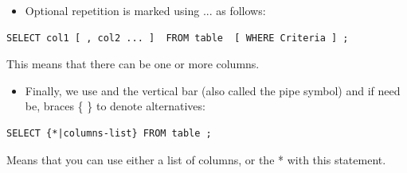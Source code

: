 \begin{itemize}
\item Optional repetition is marked using ... as follows:
\end{itemize}

\begin{lstlisting}
SELECT col1 [ , col2 ... ]  FROM table  [ WHERE Criteria ] ;
\end{lstlisting}

This means that there can be one or more columns.

\begin{itemize}
\item Finally, we use and the vertical bar {\textbar} (also called the pipe symbol) and if need be, braces \{ \} to denote alternatives:
\end{itemize}

\begin{lstlisting}
SELECT {*|columns-list} FROM table ;
\end{lstlisting}

Means that you can use either a list of columns, or the * with this statement.

\clearpage